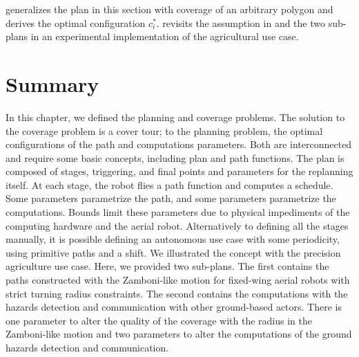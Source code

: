  generalizes the plan in this section with coverage of an arbitrary polygon and derives the optimal configuration $c_i^*$.  revisits the assumption in  and the two sub-plans in an experimental implementation of the agricultural use case.


\section{Summary}

In this chapter, we defined the planning and coverage problems. The solution to the coverage problem is a cover tour; to the planning problem, the optimal configurations of the path and computations parameters. Both are interconnected and require some basic concepts, including plan and path functions. The plan is composed of stages, triggering, and final points and parameters for the replanning itself. At each stage, the robot flies a path function and computes a schedule. Some parameters parametrize the path, and some parameters parametrize the computations. Bounds limit these parameters due to physical impediments of the computing hardware and the aerial robot. Alternatively to defining all the stages manually, it is possible defining an autonomous use case with some periodicity, using primitive paths and a shift. We illustrated the concept with the precision agriculture use case. Here, we provided two sub-plans. The first contains the paths constructed with the Zamboni-like motion for fixed-wing aerial robots with strict turning radius constraints. The second contains the computations with the hazards detection and communication with other ground-based actors. There is one parameter to alter the quality of the coverage with the radius in the Zamboni-like motion and two parameters to alter the computations of the ground hazards detection and communication.


